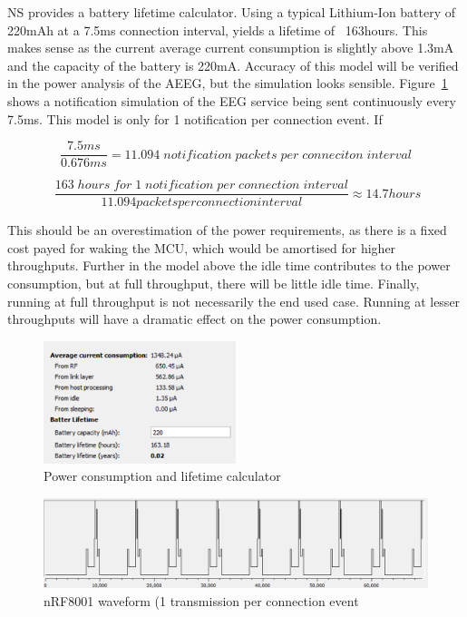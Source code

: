\documentclass[]{article}
\begin{document}
\ac{NS} provides a battery lifetime calculator. Using a typical Lithium-Ion battery of 220mAh at a 7.5ms connection interval, yields a lifetime of ~163hours. This makes sense as the current average current consumption is slightly above 1.3mA and the capacity of the battery is 220mA. Accuracy of this model will be verified in the power analysis of the \ac{AEEG}, but the simulation looks sensible. Figure~\ref{fig:nrfsim} shows a notification simulation of the EEG service being sent continuously every 7.5ms. This model is only for 1 notification per connection event. If 

\begin{displaymath}
\frac{7.5ms}{0.676ms} = 11.094\; notification\; packets\; per\; conneciton\; interval
\end{displaymath}

\begin{displaymath}
\;
\frac{163 \;hours \;for \;1 \;notification\; per\; connection\; interval}{11.094 packets per connection interval} \approx 14.7 hours
\end{displaymath}


This should be an overestimation of the power requirements, as there is a fixed cost payed for waking the MCU, which would be amortised for higher throughputs. Further in the model above the idle time contributes to the power consumption, but at full throughput, there will be little idle time. Finally, running at full throughput is not necessarily the end used case. Running at lesser throughputs will have a dramatic effect on the power consumption.
 

\begin{figure}[htb]
	\begin{center}
		\includegraphics[width = 0.5\textwidth]{nrfsim}
	\end{center}
	\caption{Power consumption and lifetime calculator}
	\label{fig:nrfsim}
\end{figure}

\begin{figure}[htb]
	\begin{center}
		\includegraphics[width = 1.1\textwidth]{nrfwave}
	\end{center}
	\caption{nRF8001 waveform (1 transmission per connection event}
	\label{fig:nrfwave}
\end{figure}
\end{document}
